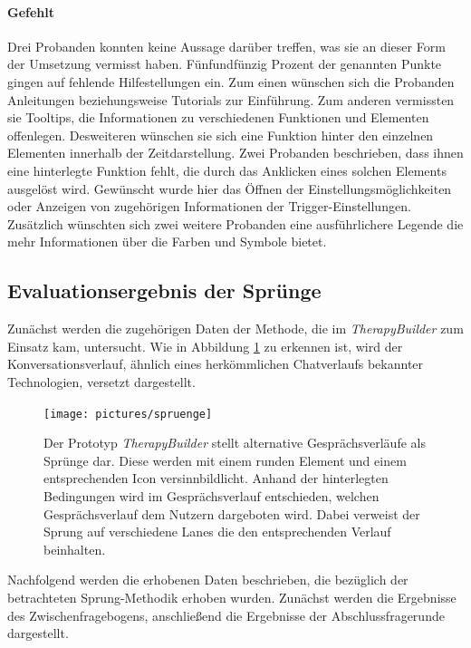 \paragraph{Gefehlt} Drei Probanden konnten keine Aussage darüber treffen, was sie an dieser Form der Umsetzung vermisst haben. Fünfundfünzig Prozent der genannten Punkte gingen auf fehlende Hilfestellungen ein. Zum einen wünschen sich die Probanden Anleitungen beziehungsweise Tutorials zur Einführung. Zum anderen vermissten sie Tooltips, die Informationen zu verschiedenen Funktionen und Elementen offenlegen. Desweiteren wünschen sie sich eine Funktion hinter den einzelnen Elementen innerhalb der Zeitdarstellung. Zwei Probanden beschrieben, dass ihnen eine hinterlegte Funktion fehlt, die durch das Anklicken eines solchen Elements ausgelöst wird. Gewünscht wurde hier das Öffnen der Einstellungsmöglichkeiten oder Anzeigen von zugehörigen Informationen der Trigger-Einstellungen. Zusätzlich wünschten sich zwei weitere Probanden eine ausführlichere Legende die mehr Informationen über die Farben und Symbole bietet.

\subsection{Evaluationsergebnis der Sprünge}
Zunächst werden die zugehörigen Daten der Methode, die im \emph{TherapyBuilder} zum Einsatz kam, untersucht. Wie in Abbildung \ref{spruenge} zu erkennen ist, wird der Konversationsverlauf, ähnlich eines herkömmlichen Chatverlaufs bekannter Technologien, versetzt dargestellt. 

\begin{figure}[h]
\centering
\texttt{[image: pictures/spruenge]}
\caption{Der Prototyp \emph{TherapyBuilder} stellt alternative Gesprächsverläufe als Sprünge dar. Diese werden mit einem runden Element und einem entsprechenden Icon versinnbildlicht. Anhand der hinterlegten Bedingungen wird im Gesprächsverlauf entschieden, welchen Gesprächsverlauf dem Nutzern dargeboten wird. Dabei verweist der Sprung auf verschiedene Lanes die den entsprechenden Verlauf beinhalten.}
\label{spruenge}
\end{figure}

Nachfolgend werden die erhobenen Daten beschrieben, die bezüglich der betrachteten Sprung-Methodik erhoben wurden. Zunächst werden die Ergebnisse des Zwischenfragebogens, anschließend die Ergebnisse der Abschlussfragerunde dargestellt.

